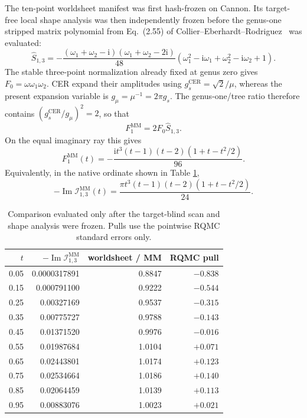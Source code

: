 \documentclass[11pt]{article}
\newcommand{\ii}{\mathrm{i}}
\newcommand{\cI}{\mathcal{I}}
\begin{document}
The ten-point worldsheet manifest was first hash-frozen on Cannon.  Its
target-free local shape analysis was then independently frozen before the
genus-one stripped matrix polynomial from Eq.~(2.55) of
Collier--Eberhardt--Rodriguez~\cite{CER} was evaluated:
\begin{equation}
 \widehat S_{1,3}
 =-\frac{(\omega_1+\omega_2-\ii)(\omega_1+\omega_2-2\ii)}{48}
 \left(\omega_1^2-\ii\omega_1+\omega_2^2-\ii\omega_2+1\right).
 \label{eq:three-point-matrix-polynomial}
\end{equation}
The stable three-point normalization already fixed at genus zero gives
$F_0=\omega\omega_1\omega_2$.  CER expand their amplitudes using
$g_s^{\mathrm{CER}}=\sqrt{2}/\mu$, whereas the present expansion variable is
$g_\mu=\mu^{-1}=2\pi g_s$.  The genus-one/tree ratio therefore contains
$(g_s^{\mathrm{CER}}/g_\mu)^2=2$, so that
\begin{equation}
 F_1^{\mathrm{MM}}=2F_0\widehat S_{1,3}.
 \label{eq:three-point-cer-to-bry}
\end{equation}
On the equal imaginary ray this gives
\begin{equation}
 F_1^{\mathrm{MM}}(t)
 =-\frac{\ii t^3(t-1)(t-2)(1+t-t^2/2)}{96}.
 \label{eq:three-point-equal-ray}
\end{equation}
Equivalently, in the native ordinate shown in Table
\ref{tab:three-point-comparison},
\begin{equation}
 -\operatorname{Im}\cI_{1,3}^{\mathrm{MM}}(t)
 =\frac{\pi t^3(t-1)(t-2)(1+t-t^2/2)}{24}.
\end{equation}

\begin{table}[htbp]
\centering
\caption{Comparison evaluated only after the target-blind scan and shape
analysis were frozen.  Pulls use the pointwise RQMC standard errors only.}
\label{tab:three-point-comparison}
\small
\begin{tabular}{r r r r}
\toprule
$t$ & $-\operatorname{Im}\cI_{1,3}^{\mathrm{MM}}$
& worldsheet / MM & RQMC pull\\
\midrule
0.05 & 0.0000317891 & 0.8847 & $-0.838$\\
0.15 & 0.000791100  & 0.9222 & $-0.544$\\
0.25 & 0.00327169   & 0.9537 & $-0.315$\\
0.35 & 0.00775727   & 0.9788 & $-0.143$\\
0.45 & 0.01371520   & 0.9976 & $-0.016$\\
0.55 & 0.01987684   & 1.0104 & $+0.071$\\
0.65 & 0.02443801   & 1.0174 & $+0.123$\\
0.75 & 0.02534664   & 1.0186 & $+0.140$\\
0.85 & 0.02064459   & 1.0139 & $+0.113$\\
0.95 & 0.00883076   & 1.0023 & $+0.021$\\
\bottomrule
\end{tabular}
\end{table}
\end{document}
